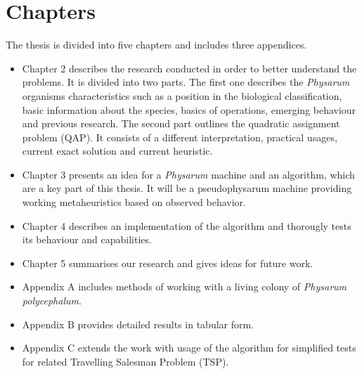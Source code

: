 \section{Chapters}
\label{section:introduction_chapters}

The thesis is divided into five chapters and includes three appendices.

\begin{itemize}
  \item Chapter 2 describes the research conducted in order to better understand the problems. It is divided into two parts. The first one describes the \textit{Physarum} organisms characteristics such as a position in the biological classification, basic information about the species, basics of operations, emerging behaviour and previous research. The second part outlines the quadratic assignment problem (QAP). It consists of a different interpretation, practical usages, current exact solution and current heuristic.
  \item Chapter 3 presents an idea for a \textit{Physarum} machine and an algorithm, which are a key part of this thesis. It will be a pseudophysarum machine providing working metaheuristics based on observed behavior.
  \item Chapter 4 describes an implementation of the algorithm and thorougly tests its behaviour and capabilities.
  \item Chapter 5 summarises our research and gives ideas for future work.
  \item Appendix A includes methods of working with a living colony of \textit{Physarum polycephalum}.
  \item Appendix B provides detailed results in tabular form.
  \item Appendix C extends the work with usage of the algorithm for simplified tests for related Travelling Salesman Problem (TSP).
\end{itemize}

